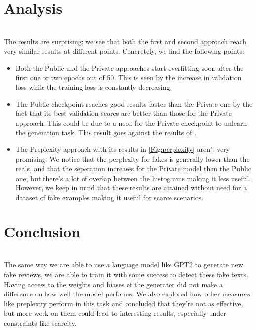 \documentclass{article}
\begin{document}
\section{Analysis}$ $
\\ The results are surprising; we see that both the first and second approach reach very similar results at different points. Concretely, we find the following points:
\begin{itemize}
\item Both the Public and the Private approaches start overfitting soon after the first one or two epochs out of 50. This is seen by the increase in validation loss while the training loss is constantly decreasing.
\item The Public checkpoint reaches good results faster than the Private one by the fact that its best validation scores are better than those for the Private approach. This could be due to a need for the Private checkpoint to unlearn the generation task. This result goes against the results of \cite{zellers2020defending}. 
\item The Preplexity approach with its results in \ref{Fig:perplexity} aren't very promising. We notice that the perplexity for fakes is generally lower than the reals, and that the seperation increases for the Private model than the Public one, but there's a lot of overlap between the histograms making it less useful. However, we keep in mind that these results are attained without need for a dataset of fake examples making it useful for scarce scenarios. 
\end{itemize}



\section{Conclusion}$ $
\\The same way we are able to use a language model like GPT2 to generate new fake reviews, we are able to train it with some success to detect these fake texts. Having access to the weights and biases of the generator did not make a difference on how well the model performs. We also explored how other measures like preplexity perform in this task and concluded that they're not as effective, but more work on them could lead to interesting results, especially under constraints like scarcity.
\end{document}
